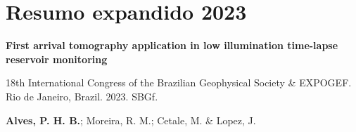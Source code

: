 \chapter{Resumo expandido 2023}

\begin{center}
	\textbf{First arrival tomography application in low illumination time-lapse reservoir monitoring}
\end{center}

\begin{center}
	18th International Congress of the Brazilian Geophysical Society \& EXPOGEF. 
	Rio de Janeiro, Brazil. 2023. SBGf. 
\end{center}

\begin{center}
	\textbf{Alves, P. H. B.}; Moreira, R. M.; Cetale, M. \& Lopez, J.    
\end{center}

